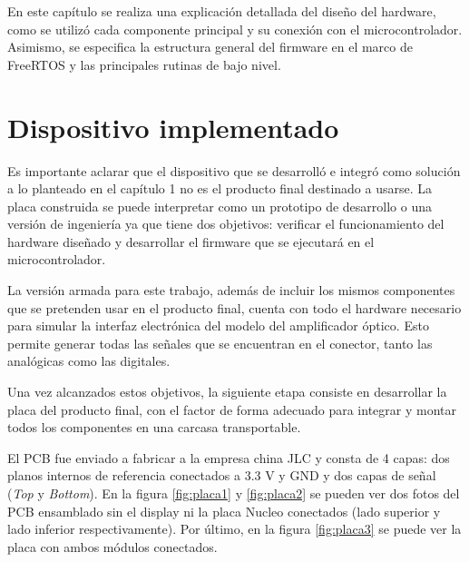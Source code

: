 
En este capítulo se realiza una explicación detallada del diseño del hardware, como se utilizó cada componente principal y su conexión con el microcontrolador. Asimismo, se especifica la estructura general del firmware en el marco de FreeRTOS y las principales rutinas de bajo nivel.

\section{Dispositivo implementado}
\label{sec:dispImp}

Es importante aclarar que el dispositivo que se desarrolló e integró como solución a lo planteado en el capítulo 1 no es el producto final destinado a usarse. La placa construida se puede interpretar como un prototipo de desarrollo o una versión de ingeniería ya que tiene dos objetivos: verificar el funcionamiento del hardware diseñado y desarrollar el firmware que se ejecutará en el microcontrolador. 

La versión armada para este trabajo, además de incluir los mismos componentes que se pretenden usar en el producto final, cuenta con todo el hardware necesario para simular la interfaz electrónica del modelo del amplificador óptico. Esto permite generar todas las señales que se encuentran en el conector, tanto las analógicas como las digitales.

Una vez alcanzados estos objetivos, la siguiente etapa consiste en desarrollar la placa del producto final, con el factor de forma adecuado para integrar y montar todos los componentes en una carcasa transportable. 

El PCB fue enviado a fabricar a la empresa china JLC y consta de 4 capas: dos planos internos de referencia conectados a 3.3 V y GND y dos capas de señal (\textit{Top} y \textit{Bottom}). En la figura \ref{fig:placa1} y \ref{fig:placa2} se pueden ver dos fotos del PCB ensamblado sin el display ni la placa Nucleo conectados (lado superior y lado inferior respectivamente). Por último, en la figura \ref{fig:placa3} se puede ver la placa con ambos módulos conectados.

